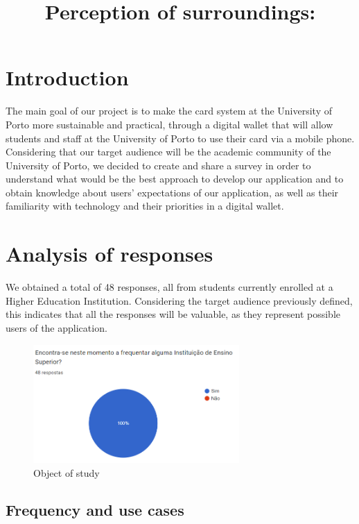 \documentclass{article}
\begin{document}
\title{Perception of surroundings:}
\maketitle

\section{Introduction}

The main goal of our project is to make the card system at the University of Porto more sustainable and practical, through a digital wallet that will allow students and staff at the University of Porto to use their card via a mobile phone.
Considering that our target audience will be the academic community of the University of Porto, we decided to create and share a survey in order to understand what would be the best approach to develop our application and
to obtain knowledge about users' expectations of our application, as well as their familiarity with technology and their priorities in a digital wallet.

\section{Analysis of responses}


We obtained a total of 48 responses, all from students currently enrolled at a Higher Education Institution. Considering the target audience previously defined, this indicates that all the responses will be valuable, as they represent possible users of the application.

\begin{figure}[h]
    \centering
    \includegraphics[width=0.7\textwidth]{images/questionaire1.png}
    \caption{Object of study}
\end{figure}


\subsection{Frequency and use cases}
\end{document}

